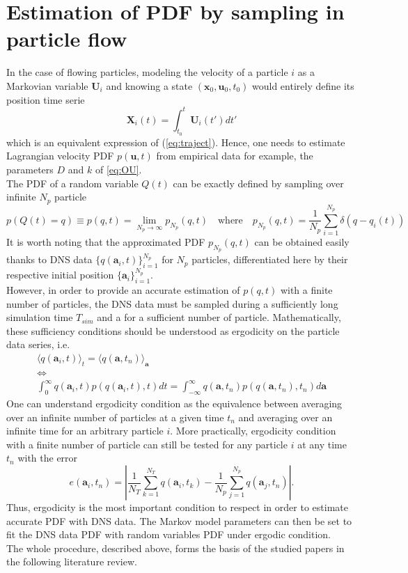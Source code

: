 \section{Estimation of PDF by sampling in particle flow}
In the case of flowing particles, modeling the velocity of a particle $i$ as a Markovian variable $\textbf{U}_i$ and knowing a state $(\textbf{x}_0,\textbf{u}_0,t_0)$ would entirely define its position time serie 
\[\textbf{X}_i(t)=\int_{t_0}^{t}\textbf{U}_i(t')dt'\]
which is an equivalent expression of (\ref{eq:traject}).
Hence, one needs to estimate Lagrangian velocity PDF $p(\textbf{u},t)$ from empirical data for example, the parameters $D$ and $k$ of \eqref{eq:OU}. 
\\The PDF of a random variable $Q(t)$ can be exactly defined by sampling over infinite $N_p$ particle
\[
p(Q(t)=q)\equiv p(q,t)=\lim\limits_{N_p\rightarrow\infty}p_{N_p}(q,t) \quad\textrm{where}\quad p_{N_p}(q,t)=\frac{1}{N_p}\sum_{i=1}^{N_p}\delta(q-q_i(t))
\]
It is worth noting that the approximated PDF $p_{N_p}(q,t)$ can be obtained easily thanks to DNS data $\{q(\textbf{a}_i,t)\}_{i=1}^{N_p}$ for $N_p$ particles, differentiated here by their respective initial position $\{\textbf{a}_i\}_{i=1}^{N_p}$.\\

However, in order to provide an accurate estimation of $p(q,t)$ with a finite number of particles, the DNS data 
must be sampled during a sufficiently long simulation time $T_{sim}$ and a for a sufficient number of particle. 
Mathematically, these sufficiency conditions should be understood as ergodicity on the particle data series, i.e.
\begin{equation}
\begin{array}{c}
	\langle q(\textbf{a}_i,t)\rangle_t = \langle q(\textbf{a},t_n)\rangle_{\textbf{a}}\\
	\Leftrightarrow\\
	\int_{0}^{\infty}q(\textbf{a}_i,t) p(q(\textbf{a}_i,t),t)dt=\int_{-\infty}^{\infty}q(\textbf{a},t_n)p(q(\textbf{a},t_n),t_n)d\textbf{a}
\end{array}
\label{eq:ergodicity}
\end{equation}
One can understand ergodicity condition as the equivalence between averaging over an infinite number of particles at a given time $t_n$ and averaging over an infinite time for an arbitrary particle $i$. 
More practically, ergodicity condition with a finite number of particle can still be tested for any particle $i$ at any time $t_n$ with the error
\begin{equation}\label{eq:ergo_err}
	e(\textbf{a}_i,t_n)=|\frac{1}{N_T}\sum_{k=1}^{N_T}q(\textbf{a}_i,t_k)-\frac{1}{N_p}\sum_{j=1}^{N_p}q(\textbf{a}_j,t_n)|.
\end{equation}
Thus, ergodicity is the most important condition to respect in order to estimate accurate PDF with DNS data. The Markov model parameters can then be set to fit the DNS data PDF with random variables PDF under ergodic condition.\\
The whole procedure, described above, forms the basis of the studied papers in the following literature review.\\

